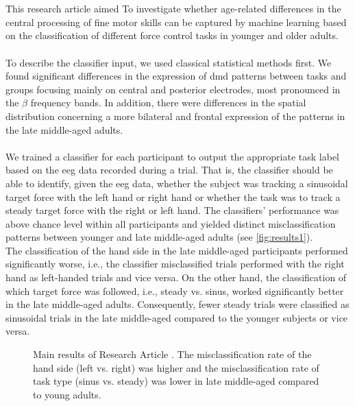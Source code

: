 \\
\\
This research article aimed To investigate whether age-related differences in the central processing of fine motor skills can be captured by machine learning based on the classification of different force control tasks in younger and older adults.\\
\\
To describe the classifier input, we used classical statistical methods first. We found significant differences in the expression of \gls{dmd} patterns between tasks and groups focusing mainly on central and posterior electrodes, most pronounced in the $\beta$ frequency bands. In addition, there were differences in the spatial distribution concerning a more bilateral and frontal expression of the patterns in the late middle-aged adults.\\
\\
We trained a classifier for each participant to output the appropriate task label based on the \gls{eeg} data recorded during a trial. That is, the classifier should be able to identify, given the \gls{eeg} data, whether the subject was tracking a sinusoidal target force with the left hand or right hand or whether the task was to track a steady target force with the right or left hand. The classifiers' performance was above chance level within all participants and yielded distinct misclassification patterns between younger and late middle-aged adults (see \autoref{fig:results1}).\\
The classification of the hand side in the late middle-aged participants performed significantly worse, i.e., the classifier misclassified trials performed with the right hand as left-handed trials and vice versa. On the other hand, the classification of which target force was followed, i.e., steady vs. sinus, worked significantly better in the late middle-aged adults. Consequently, fewer steady trials were classified as sinusoidal trials in the late middle-aged compared to the younger subjects or vice versa.

\begin{figure}[h]
\begin{center}

\caption[Main results of Research Article .]{Main results of Research Article . The misclassification rate of the hand side (left vs. right)  was higher and the misclassification rate of task type (sinus vs. steady) was lower in late middle-aged compared to young adults.}
\label{fig:results1}
\end{center}
\end{figure}

